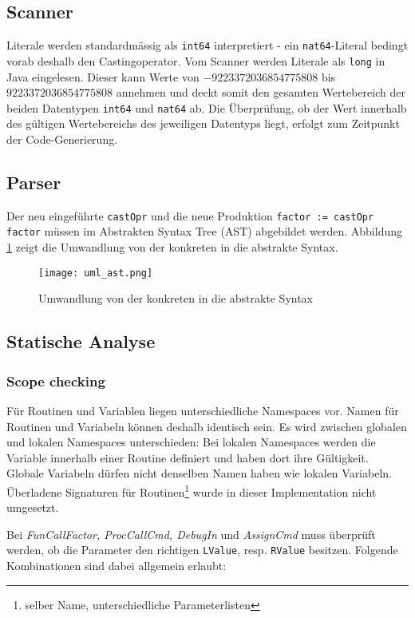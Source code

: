 \documentclass[10pt, a4paper, twocolumn]{article} %
\begin{document}
\subsection{Scanner}
Literale werden standardmässig als \texttt{int64} interpretiert - ein \texttt{nat64}-Literal bedingt vorab deshalb den Castingoperator.
Vom Scanner werden Literale als \texttt{long} in Java eingelesen.
Dieser kann Werte von $-9223372036854775808$ bis $9223372036854775808$ annehmen und deckt somit den gesamten Wertebereich der beiden Datentypen \texttt{int64} und \texttt{nat64} ab.
Die Überprüfung, ob der Wert innerhalb des gültigen Wertebereichs des jeweiligen Datentyps liegt, erfolgt zum Zeitpunkt der Code-Generierung.

\subsection{Parser}
Der neu eingeführte \texttt{castOpr} und die neue Produktion \texttt{factor := castOpr factor} müssen im Abstrakten Syntax Tree (AST) abgebildet werden.
Abbildung \ref{ast} zeigt die Umwandlung von der konkreten in die abstrakte Syntax.

\begin{figure}[H]
    \texttt{[image: uml\_ast.png]} %
    \caption{Umwandlung von der konkreten in die abstrakte Syntax} %
    \label{ast}
\end{figure}
\subsection{Statische Analyse}

\subsubsection*{Scope checking}
Für Routinen und Variablen liegen unterschiedliche Namespaces vor.
Namen für Routinen und Variabeln können deshalb identisch sein.
Es wird zwischen globalen und lokalen Namespaces unterschieden: Bei lokalen Namespaces werden die Variable innerhalb einer Routine definiert und haben dort ihre Gültigkeit.
Globale Variabeln dürfen nicht denselben Namen haben wie lokalen Variabeln.
Überladene Signaturen für Routinen\footnote{selber Name, unterschiedliche Parameterlisten} wurde in dieser Implementation nicht umgesetzt.

Bei \textit{FunCallFactor, ProcCallCmd, DebugIn} und \textit{AssignCmd} muss überprüft werden, ob die Parameter den richtigen \texttt{LValue}, resp. \texttt{RValue} besitzen.
Folgende Kombinationen sind dabei allgemein erlaubt:
\end{document}
